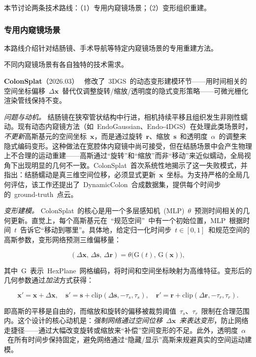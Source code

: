 本节讨论两条技术路线：（1）专用内窥镜场景；（2）变形组织重建。

\subsubsection{专用内窥镜场景}

本路线介绍针对结肠镜、手术导航等特定内窥镜场景的专用重建方法。

不同内窥镜场景有各自独特的技术需求。

\textbf{ ColonSplat}（2026.03）~\cite{2603_06860} 修改了~3DGS~的动态变形建模环节——用时间相关的空间坐标偏移~$\Delta\mathbf{x}$~替代仅调整旋转/缩放/透明度的隐式变形策略——可微光栅化渲染管线保持不变。

\textit{问题与动机。}
结肠镜在狭窄管状结构中行进，相机持续平移且组织发生非刚性蠕动。现有动态内窥镜方法（如~EndoGaussian、Endo-4DGS）在处理此类场景时，\emph{不更新}高斯基元的空间坐标~$\mathbf{x}$，而是通过旋转~$\mathbf{r}$、缩放~$\mathbf{s}$~和透明度~$\alpha$~的调整来隐式编码变形。这种做法在宽腔体内窥镜中尚可接受，但在结肠场景中会产生物理上不合理的运动重建——高斯通过``旋转''和``缩放''而非``移动''来近似蠕动，全局视角下出现明显的几何不一致。ColonSplat~首次系统性地揭示了这一失败模式，并指出：结肠蠕动是真三维空间位移，必须显式更新~$\mathbf{x}$~坐标。为支持严格的全局几何评估，该工作还提出了~DynamicColon~合成数据集，提供每个时间步的~ground-truth~点云。

\textit{变形建模。}
ColonSplat~的核心是用一个多层感知机~(MLP)~$\theta$~预测时间相关的几何更新。直觉上，每个高斯基元在~``规范空间''~中有一个初始位置，MLP~根据时间~$t$~告诉它``移动到哪里''。具体地，给定归一化时间步~$t \in [0,1]$~和规范空间的高斯参数，变形网络预测三维偏移量：

\begin{equation}
    (\Delta\mathbf{x},\, \Delta\mathbf{s},\, \Delta\mathbf{r}) = \theta\!\bigl(\mathrm{G}(t),\, \mathrm{G}(\mathbf{x})\bigr),
\end{equation}

其中~$\mathrm{G}$~表示~HexPlane~网格编码，将时间和空间坐标映射为高维特征。变形后的几何参数通过\emph{加法}方式获得：

\begin{equation}
    \mathbf{x}' = \mathbf{x} + \Delta\mathbf{x},\quad
    \mathbf{s}' = \mathbf{s} + \mathrm{clip}(\Delta\mathbf{s}, -\tau_s, \tau_s),\quad
    \mathbf{r}' = \mathbf{r} + \mathrm{clip}(\Delta\mathbf{r}, -\tau_r, \tau_r).
\end{equation}

即高斯的平移是自由的，而缩放和旋转的偏移被裁剪阈值~$\tau_s$、$\tau_r$~限制在合理范围内。这个设计的核心动机是：\emph{强制网络通过空间位移~$\Delta\mathbf{x}$~来表达变形}，防止网络走捷径——通过大幅改变旋转或缩放来``补偿''空间变形的不足。此外，透明度~$\alpha$~在所有时间步保持固定，避免网络通过``隐藏/显示''高斯来规避真实的空间运动建模。

